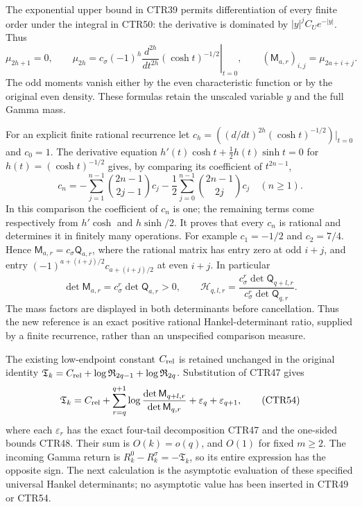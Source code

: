 \documentclass[11pt,a4paper]{article}
\begin{document}
The exponential upper bound in CTR39 permits differentiation of every
finite order under the integral in CTR50: the derivative is dominated
by $|y|^jC_Ue^{-|y|}$. Thus
\[
 \mu_{2h+1}=0,\qquad
 \mu_{2h}
  =c_\sigma(-1)^h
     \left.\frac{d^{2h}}{dt^{2h}}(\cosh t)^{-1/2}\right|_{t=0},
 \qquad
 (\mathsf M_{a,r})_{i,j}=\mu_{2a+i+j}.
 \tag{CTR51}
\]
The odd moments vanish either by the even characteristic function or
by the original even density. These formulas retain the unscaled
variable $y$ and the full Gamma mass.

For an explicit finite rational recurrence let
$c_h=((d/dt)^{2h}(\cosh t)^{-1/2})|_{t=0}$ and $c_0=1$.
The derivative equation
$h'(t)\cosh t+\tfrac12h(t)\sinh t=0$ for $h(t)=(\cosh t)^{-1/2}$
gives, by comparing its coefficient of $t^{2n-1}$,
\[
 c_n=
 -\sum_{j=1}^{n-1}\binom{2n-1}{2j-1}c_j
 -\frac12\sum_{j=0}^{n-1}\binom{2n-1}{2j}c_j
 \quad(n\geq1).
 \tag{CTR52}
\]
In this comparison the coefficient of $c_n$ is one; the remaining
terms come respectively from $h'\cosh$ and $h\sinh/2$.
It proves that every $c_n$ is rational and determines it in finitely
many operations. For example $c_1=-1/2$ and $c_2=7/4$.
Hence $\mathsf M_{a,r}=c_\sigma\mathsf Q_{a,r}$, where the rational
matrix has entry zero at odd $i+j$, and entry
$(-1)^{a+(i+j)/2}c_{a+(i+j)/2}$ at even $i+j$.
In particular
\[
 \det\mathsf M_{a,r}=c_\sigma^r\det\mathsf Q_{a,r}>0,\qquad
 \mathcal H_{q,l,r}
   =\frac{c_\sigma^r\det\mathsf Q_{q+l,r}}
          {c_\sigma^r\det\mathsf Q_{q,r}} .
 \tag{CTR53}
\]
The mass factors are displayed in both determinants before cancellation.
Thus the new reference is an exact positive rational Hankel-determinant
ratio, supplied by a finite recurrence, rather than an unspecified
comparison measure.

The existing low-endpoint constant $C_{\rm rel}$ is retained unchanged
in the original identity
$\mathfrak T_k=C_{\rm rel}+\log\mathfrak R_{2q-1}
                              +\log\mathfrak R_{2q}$.
Substitution of CTR47 gives
\[
 \mathfrak T_k=C_{\rm rel}
      +\sum_{r=q}^{q+1}
          \log\frac{\det\mathsf M_{q+l,r}}{\det\mathsf M_{q,r}}
      +\varepsilon_q+\varepsilon_{q+1},
 \tag{CTR54}
\]
where each $\varepsilon_r$ has the exact four-tail decomposition
CTR47 and the one-sided bounds CTR48. Their sum is $O(k)=o(q)$,
and $O(1)$ for fixed $m\geq2$. The incoming Gamma return is
$R_k^0-R_k^\sigma=-\mathfrak T_k$, so its entire expression has the
opposite sign. The next calculation is the asymptotic evaluation of
these specified universal Hankel determinants; no asymptotic value
has been inserted in CTR49 or CTR54.
\end{document}
